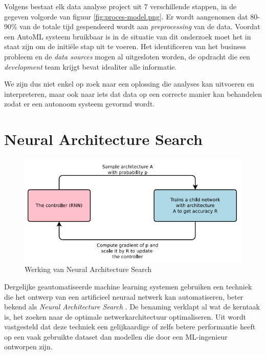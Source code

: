 Volgens \textcite{Lemahieu2018} bestaat elk data analyse project uit 7 verschillende stappen, in de gegeven volgorde van figuur \ref{fig:proces-model.png}. Er wordt aangenomen dat 80-90\% van de totale tijd gespendeerd wordt aan \textit{preprocessing} van de data. Voordat een AutoML systeem bruikbaar is in de situatie van dit onderzoek moet het in staat zijn om de initiële stap uit te voeren. Het identificeren van het business probleem en de \textit{data sources} mogen al uitgesloten worden, de opdracht die een \textit{development} team krijgt bevat idealiter alle informatie. 

We zijn dus niet enkel op zoek naar een oplossing die analyses kan uitvoeren en interpreteren, maar ook naar iets dat data op een correcte manier kan behandelen zodat er een autonoom systeem gevormd wordt. 

\section{Neural Architecture Search}
\label{sec:nas}

\begin{figure}
    \includegraphics[width=\linewidth]{img/nas.png}
    \caption{Werking van Neural Architecture Search \autocite{ZophL2016}}
    \label{fig:nas-bp}
\end{figure}

Dergelijke geautomatiseerde machine learning systemen gebruiken een techniek die het ontwerp van een artificieel neuraal netwerk kan automatiseren, beter bekend als \textit{Neural Architecture Search} \autocite{Elsken2019}. De benaming verklapt al wat de kerntaak is, het zoeken naar de optimale netwerkarchitectuur optimaliseren. Uit \textcite{ZophL2016} wordt vastgesteld dat deze techniek een gelijkaardige of zelfs betere performantie heeft op een vaak gebruikte dataset dan modellen die door een ML-ingenieur ontworpen zijn.

